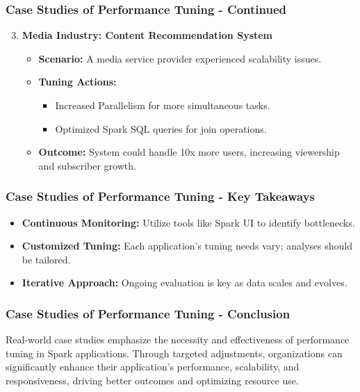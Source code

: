 \documentclass[aspectratio=169]{beamer}
\begin{document}
\begin{frame}[fragile]
    \frametitle{Case Studies of Performance Tuning - Continued}
    \begin{enumerate}
        \setcounter{enumi}{2} %
        \item \textbf{Media Industry: Content Recommendation System}
            \begin{itemize}
                \item \textbf{Scenario:} A media service provider experienced scalability issues.
                \item \textbf{Tuning Actions:}
                    \begin{itemize}
                        \item Increased Parallelism for more simultaneous tasks.
                        \item Optimized Spark SQL queries for join operations.
                    \end{itemize}
                \item \textbf{Outcome:} System could handle 10x more users, increasing viewership and subscriber growth.
            \end{itemize}
    \end{enumerate}
\end{frame}

\begin{frame}[fragile]
    \frametitle{Case Studies of Performance Tuning - Key Takeaways}
    \begin{itemize}
        \item \textbf{Continuous Monitoring:} Utilize tools like Spark UI to identify bottlenecks.
        \item \textbf{Customized Tuning:} Each application's tuning needs vary; analyses should be tailored.
        \item \textbf{Iterative Approach:} Ongoing evaluation is key as data scales and evolves.
    \end{itemize}
\end{frame}

\begin{frame}[fragile]
    \frametitle{Case Studies of Performance Tuning - Conclusion}
    Real-world case studies emphasize the necessity and effectiveness of performance tuning in Spark applications. Through targeted adjustments, organizations can significantly enhance their application's performance, scalability, and responsiveness, driving better outcomes and optimizing resource use.
\end{frame}
\end{document}
